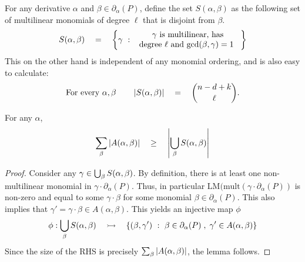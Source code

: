 For any derivative $\alpha$ and $\beta \in \partial_\alpha(P)$, define the set $S(\alpha, \beta)$ as the following set of multilinear monomials of degree $\ell$ that is disjoint from $\beta$. 
\[
S(\alpha, \beta) \quad = \quad \left\{{\gamma}\ : \ {\begin{array}{c}\text{$\gamma$ is multilinear, has}\\\text{degree $\ell$ and $\gcd(\beta,\gamma)=1$ }\end{array}}\right\}
\]
This on the other hand is independent of any monomial ordering, and is also easy to calculate:
\[
\text{For every $\alpha, \beta$}\quad\quad \left|S(\alpha, \beta)\right| \quad = \quad \binom{n - d + k}{\ell}.
\] 
\begin{lemma}[\cite{KS14}]\label{lem:As-to-Ss}
For any $\alpha$, 
\[
\sum_{\beta} \left|A(\alpha, \beta)\right| \quad \geq \quad \left|\bigcup_{\beta} S(\alpha, \beta)\right|
\]
\end{lemma}
\begin{proof}
Consider any $\gamma \in \bigcup_{\beta}S(\alpha, \beta)$. 
By definition, there is at least one non-multilinear monomial in $\gamma \cdot \partial_\alpha(P)$. 
Thus, in particular $\mathrm{LM}(\mathrm{mult}(\gamma \cdot \partial_\alpha(P))$ is non-zero and equal to some $\gamma \cdot \beta$ for some monomial $\beta \in \partial_\alpha(P)$. 
This also implies that $\gamma' = \gamma\cdot \beta \in A(\alpha, \beta)$. 
This yields an injective map $\phi$ 
\[
\phi:\bigcup_\beta S(\alpha,\beta) \quad \rightarrowtail \quad \left\{{(\beta, \gamma')}\ : \ {\beta\in \partial_\alpha(P)\;,\;\gamma' \in A(\alpha, \beta)}\right\}
\] 
Since the size of the RHS is precisely $\sum_\beta \left|A(\alpha, \beta)\right|$, the lemma follows. 
\end{proof}

